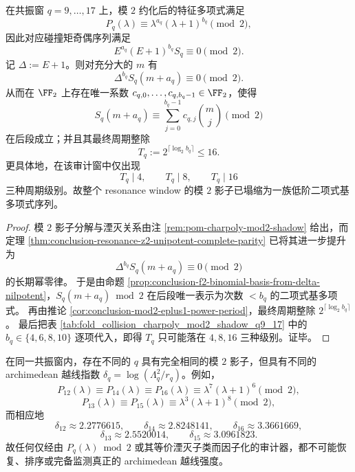\begin{theorem}\label{thm:conclusion-resonance-window-mod2-binomial-collapse}
在共振窗 \(q=9,\dots,17\) 上，模 \(2\) 约化后的特征多项式满足
\[
P_q(\lambda)\equiv \lambda^{a_q}(\lambda+1)^{b_q}\pmod 2,
\]
因此对应碰撞矩奇偶序列满足
\[
E^{a_q}(E+1)^{b_q}S_q\equiv 0\pmod 2.
\]
记 \(\Delta:=E+1\)。则对充分大的 \(m\) 有
\[
\Delta^{b_q}S_q(m+a_q)\equiv 0\pmod 2.
\]
从而在 \(\FF_2\) 上存在唯一系数 \(c_{q,0},\dots,c_{q,b_q-1}\in\FF_2\)，使得
\[
S_q(m+a_q)\equiv \sum_{j=0}^{b_q-1}c_{q,j}\binom{m}{j}\pmod 2
\]
在后段成立；并且其最终周期整除
\[
T_q:=2^{\lceil\log_2 b_q\rceil}\le 16.
\]
更具体地，在该审计窗中仅出现
\[
T_q\mid 4,\qquad T_q\mid 8,\qquad T_q\mid 16
\]
三种周期级别。故整个 resonance window 的模 \(2\) 影子已塌缩为一族低阶二项式基多项式序列。
\end{theorem}

\begin{proof}
模 \(2\) 影子分解与湮灭关系由注 \ref{rem:pom-charpoly-mod2-shadow} 给出，而定理 \ref{thm:conclusion-resonance-z2-unipotent-complete-parity} 已将其进一步提升为
\[
\Delta^{b_q}S_q(m+a_q)\equiv 0\pmod 2
\]
的长期幂零律。
于是由命题 \ref{prop:conclusion-f2-binomial-basis-from-delta-nilpotent}，\(S_q(m+a_q)\bmod 2\) 在后段唯一表示为次数 \(<b_q\) 的二项式基多项式。
再由推论 \ref{cor:conclusion-mod2-eplus1-power-period}，最终周期整除 \(2^{\lceil\log_2 b_q\rceil}\)。
最后把表 \ref{tab:fold_collision_charpoly_mod2_shadow_q9_17} 中的 \(b_q\in\{4,6,8,10\}\) 逐项代入，即得 \(T_q\) 只可能落在 \(4,8,16\) 三种级别。证毕。
\end{proof}

\begin{corollary}\label{cor:conclusion-mod2-shadow-insufficient-for-archimedean-instability}
在同一共振窗内，存在不同的 \(q\) 具有完全相同的模 \(2\) 影子，但具有不同的 archimedean 越线指数 \(\delta_q=\log(\Lambda_q^2/r_q)\)。例如，
\[
P_{12}(\lambda)\equiv P_{14}(\lambda)\equiv P_{16}(\lambda)\equiv \lambda^7(\lambda+1)^6\pmod 2,
\]
\[
P_{13}(\lambda)\equiv P_{15}(\lambda)\equiv \lambda^3(\lambda+1)^8\pmod 2,
\]
而相应地
\[
\delta_{12}\approx 2.2776615,\qquad
\delta_{14}\approx 2.8248141,\qquad
\delta_{16}\approx 3.3661669,
\]
\[
\delta_{13}\approx 2.5520014,\qquad
\delta_{15}\approx 3.0961823.
\]
故任何仅经由 \(P_q(\lambda)\bmod 2\) 或其等价湮灭子类而因子化的审计器，都不可能恢复、排序或完备监测真正的 archimedean 越线强度。
\end{corollary}

